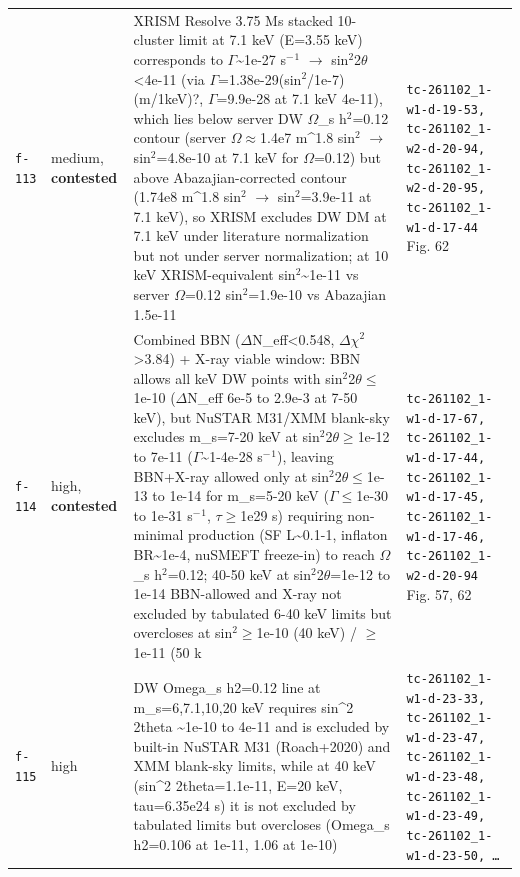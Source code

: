 \documentclass[11pt,a4paper]{article}
\begin{document}
\begin{longtable}{@{}p{}p{}p{}p{}@{}}
\texttt{f-113} & medium, \textbf{contested} & XRISM Resolve 3.75 Ms stacked 10-cluster limit at 7.1 keV (E=3.55 keV) corresponds to $\Gamma$\textasciitilde{}1e-27 s$^-$$^1$ $\to$ sin$^2$2$\theta$\textless{}4e-11 (via $\Gamma$=1.38e-29(sin$^2$/1e-7)(m/1keV)?, $\Gamma$=9.9e-28 at 7.1 keV 4e-11), which lies below server DW $\Omega$\_s h$^2$=0.12 contour (server $\Omega$$\approx$1.4e7 m\textasciicircum{}1.8 sin$^2$ $\to$ sin$^2$=4.8e-10 at 7.1 keV for $\Omega$=0.12) but above Abazajian-corrected contour (1.74e8 m\textasciicircum{}1.8 sin$^2$ $\to$ sin$^2$=3.9e-11 at 7.1 keV), so XRISM excludes DW DM at 7.1 keV under literature normalization but not under server normalization; at 10 keV XRISM-equivalent sin$^2$\textasciitilde{}1e-11 vs server $\Omega$=0.12 sin$^2$=1.9e-10 vs Abazajian 1.5e-11 & \texttt{tc-261102\_\allowbreak{}1-w1-d-19-53,\allowbreak{} tc-261102\_\allowbreak{}1-w2-d-20-94,\allowbreak{} tc-261102\_\allowbreak{}1-w2-d-20-95,\allowbreak{} tc-261102\_\allowbreak{}1-w1-d-17-44} Fig. 62 \\
\texttt{f-114} & high, \textbf{contested} & Combined BBN ($\Delta$N\_eff\textless{}0.548, $\Delta$$\chi$$^2$\textgreater{}3.84) + X-ray viable window: BBN allows all keV DW points with sin$^2$2$\theta$$\leq$1e-10 ($\Delta$N\_eff 6e-5 to 2.9e-3 at 7-50 keV), but NuSTAR M31/XMM blank-sky excludes m\_s=7-20 keV at sin$^2$2$\theta$$\geq$1e-12 to 7e-11 ($\Gamma$\textasciitilde{}1-4e-28 s$^-$$^1$), leaving BBN+X-ray allowed only at sin$^2$2$\theta$$\leq$1e-13 to 1e-14 for m\_s=5-20 keV ($\Gamma$$\leq$1e-30 to 1e-31 s$^-$$^1$, $\tau$$\geq$1e29 s) requiring non-minimal production (SF L\textasciitilde{}0.1-1, inflaton BR\textasciitilde{}1e-4, nuSMEFT freeze-in) to reach $\Omega$\_s h$^2$=0.12; 40-50 keV at sin$^2$2$\theta$=1e-12 to 1e-14 BBN-allowed and X-ray not excluded by tabulated 6-40 keV limits but overcloses at sin$^2$$\geq$1e-10 (40 keV) / $\geq$1e-11 (50 k & \texttt{tc-261102\_\allowbreak{}1-w1-d-17-67,\allowbreak{} tc-261102\_\allowbreak{}1-w1-d-17-44,\allowbreak{} tc-261102\_\allowbreak{}1-w1-d-17-45,\allowbreak{} tc-261102\_\allowbreak{}1-w1-d-17-46,\allowbreak{} tc-261102\_\allowbreak{}1-w2-d-20-94} Fig. 57, 62 \\
\texttt{f-115} & high & DW Omega\_s h2=0.12 line at m\_s=6,7.1,10,20 keV requires sin\textasciicircum{}2 2theta \textasciitilde{}1e-10 to 4e-11 and is excluded by built-in NuSTAR M31 (Roach+2020) and XMM blank-sky limits, while at 40 keV (sin\textasciicircum{}2 2theta=1.1e-11, E=20 keV, tau=6.35e24 s) it is not excluded by tabulated limits but overcloses (Omega\_s h2=0.106 at 1e-11, 1.06 at 1e-10) & \texttt{tc-261102\_\allowbreak{}1-w1-d-23-33,\allowbreak{} tc-261102\_\allowbreak{}1-w1-d-23-47,\allowbreak{} tc-261102\_\allowbreak{}1-w1-d-23-48,\allowbreak{} tc-261102\_\allowbreak{}1-w1-d-23-49,\allowbreak{} tc-261102\_\allowbreak{}1-w1-d-23-50,\allowbreak{} \ldots{}\allowbreak{}} \\

\end{longtable}
\end{document}
